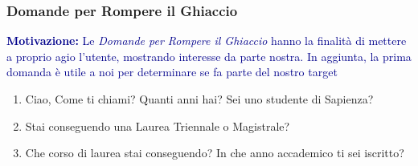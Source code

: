 \subsubsection{Domande per Rompere il Ghiaccio}
\textcolor{darkblue}{\textbf{Motivazione:} Le \textit{Domande per Rompere il Ghiaccio} hanno la finalità
di mettere a proprio agio l'utente, mostrando interesse da parte nostra. 
In aggiunta, la prima domanda è utile a noi per determinare se fa parte del nostro target}
\begin{enumerate}
    \item Ciao, Come ti chiami? Quanti anni hai? Sei uno studente di Sapienza?
    \item Stai conseguendo una Laurea Triennale o Magistrale?
    \item Che corso di laurea stai conseguendo?  In che anno accademico ti sei iscritto?
\end{enumerate}

